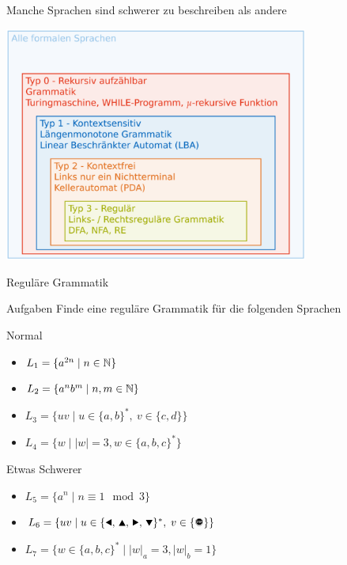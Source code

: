 \begin{frame}[fragile]{Manche Sprachen sind schwerer zu beschreiben als andere}
    \begin{center}
        \includegraphics[width=0.75\textwidth]{../figures/Chomsky.png}
    \end{center}
\end{frame}

{
\begin{frame}{Reguläre Grammatik}
    \begin{alertblock}{Aufgaben}
    Finde eine reguläre Grammatik für die folgenden Sprachen
    \end{alertblock}
    \begin{block}{Normal}
    \begin{itemize}
        \item $L_1 = \{a^{2n} \mid n\in\mathbb{N}\}$
        \item $L_2 = \{a^nb^m \mid n, m\in\mathbb{N}\}$
        \item $L_3 = \{uv \mid u\in\{a,b\}^\ast,\ v\in\{c,d\}\}$
        \item $L_4 = \{w \mid |w| = 3, w\in \{a,b,c\}^*\}$
    \end{itemize}
    \end{block}
    \begin{block}{Etwas Schwerer}
    \begin{itemize}
        \item $L_5 = \{a^n \mid n \equiv 1 \mod 3\}$
        \item $L_6 = \{uv\mid u\in\{\text{\Rewind, \MoveUp, \Forward, \MoveDown}\}^\ast,\;v\in\{\text{\Stopsign}\}\}$
        \item $L_7 = \{w \in \{a,b,c\}^* \mid |w|_a = 3, |w|_b = 1\}$
    \end{itemize}
    \end{block}
\end{frame}
}

